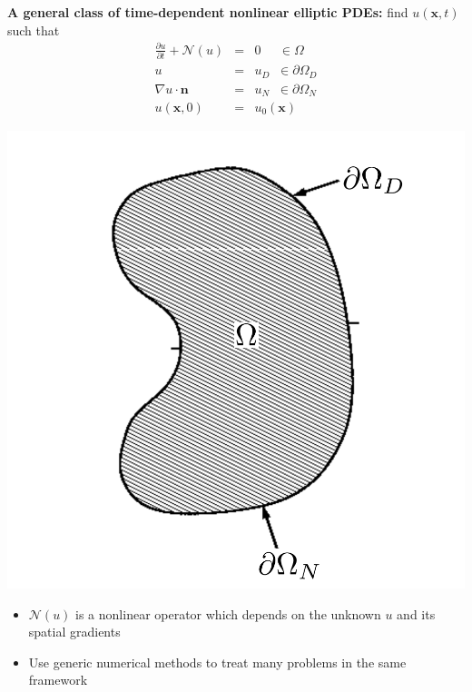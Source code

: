 \documentclass[compress,12pt]{beamer}
\newcommand{\bv}[1]{{\boldsymbol{#1}}}
\begin{document}
\begin{frame}%
 \begin{minipage}[h]{.4\textwidth}
   \textbf{A general class of time-dependent nonlinear elliptic PDEs:}
   find $u(\bv{x},t)$ such that
   \begin{eqnarray}
     \label{eqn:general_pde}
     \nonumber
     \frac{\partial u}{\partial t} + \mathcal{N}( u ) & = & 0 \;\;\;\;\; \in \Omega \\
     \nonumber
   u & = & u_D \;\; \in \partial \Omega_D \\
   \nonumber
   \nabla u \cdot \bv{n} & = & u_N \;\; \in \partial \Omega_N \\
   \nonumber
   u(\bv{x}, 0) & = & u_0(\bv{x}) 
   \end{eqnarray}
 \end{minipage}
 \hspace{0.5in}
 \begin{minipage}[h]{.4\textwidth}
   \includegraphics[width=\textwidth]{figures/domain}
 \end{minipage}

\vspace{.05\textheight}

 \begin{itemize}
   \item $\mathcal{N}( u )$ is a nonlinear operator which depends on the unknown
     $u$ and its spatial gradients%
   \item Use generic numerical methods to treat many problems in the same framework
 \end{itemize}
\end{frame}
\end{document}
